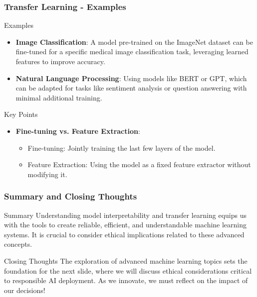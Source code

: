 \documentclass[aspectratio=169]{beamer}
\begin{document}
\begin{frame}[fragile]
    \frametitle{Transfer Learning - Examples}
    \begin{block}{Examples}
        \begin{itemize}
            \item \textbf{Image Classification}: A model pre-trained on the ImageNet dataset can be fine-tuned for a specific medical image classification task, leveraging learned features to improve accuracy.
            \item \textbf{Natural Language Processing}: Using models like BERT or GPT, which can be adapted for tasks like sentiment analysis or question answering with minimal additional training.
        \end{itemize}
    \end{block}

    \begin{block}{Key Points}
        \begin{itemize}
            \item \textbf{Fine-tuning vs. Feature Extraction}:
            \begin{itemize}
                \item Fine-tuning: Jointly training the last few layers of the model.
                \item Feature Extraction: Using the model as a fixed feature extractor without modifying it.
            \end{itemize}
        \end{itemize}
    \end{block}
\end{frame}

\begin{frame}[fragile]
    \frametitle{Summary and Closing Thoughts}
    \begin{block}{Summary}
        Understanding model interpretability and transfer learning equips us with the tools to create reliable, efficient, and understandable machine learning systems. It is crucial to consider ethical implications related to these advanced concepts.
    \end{block}

    \begin{block}{Closing Thoughts}
        The exploration of advanced machine learning topics sets the foundation for the next slide, where we will discuss ethical considerations critical to responsible AI deployment. As we innovate, we must reflect on the impact of our decisions!
    \end{block}
\end{frame}
\end{document}
